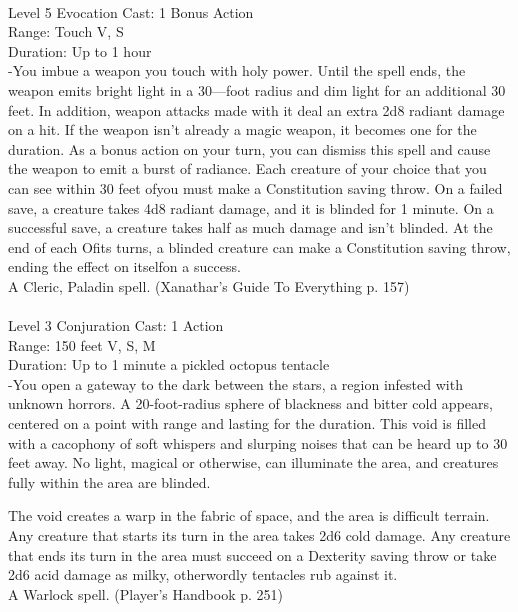 \documentclass[10pt,twocolumn]{report}
\begin{document}
 \\
Level 5 \quad Evocation \quad Cast: 1 Bonus Action\\
Range: Touch \quad V, S\\
Duration: Up to 1 hour \quad \\
-You imbue a weapon you touch with holy power. Until the spell ends, the weapon emits bright light in a 30—foot radius and dim light for an additional 30 feet. In addition, weapon attacks made with it deal an extra 2d8 radiant damage on a hit. If the weapon isn’t already a magic weapon, it becomes one for the duration. As a bonus action on your turn, you can dismiss this spell and cause the weapon to emit a burst of radiance. Each creature of your choice that you can see within 30 feet ofyou must make a Constitution saving throw. On a failed save, a creature takes 4d8 radiant damage, and it is blinded for 1 minute. On a successful save, a creature takes half as much damage and isn’t blinded. At the end of each Ofits turns, a blinded creature can make a Constitution saving throw, ending the effect on itselfon a success.\\
A Cleric, Paladin spell. (Xanathar's Guide To Everything p. 157) \\


 \\
Level 3 \quad Conjuration \quad Cast: 1 Action\\
Range: 150 feet \quad V, S, M\\
Duration: Up to 1 minute \quad a pickled octopus tentacle\\
-You open a gateway to the dark between the stars, a region infested with unknown horrors. A 20-foot-radius sphere of blackness and bitter cold appears, centered on a point with range and lasting for the duration. This void is filled with a cacophony of soft whispers and slurping noises that can be heard up to 30 feet away. No light, magical or otherwise, can illuminate the area, and creatures fully within the area are blinded.

The void creates a warp in the fabric of space, and the area is difficult terrain. Any creature that starts its turn in the area takes 2d6 cold damage. Any creature that ends its turn in the area must succeed on a Dexterity saving throw or take 2d6 acid damage as milky, otherwordly tentacles rub against it.\\
A Warlock spell. (Player's Handbook p. 251) \\
\end{document}
